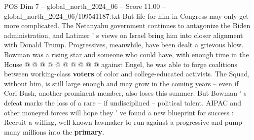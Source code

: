 \begin{textsample}{POS Dim 7 – global\_north\_2024\_06 – Score 11.00 – global\_north\_2024\_06/109541187.txt}
But life for him in Congress may only get more complicated.
The Netanyahu government continues to antagonize the Biden administration, and Latimer ' s views on Israel bring him into closer alignment with Donald Trump.
Progressives, meanwhile, have been dealt a grievous blow.
Bowman was a rising star and someone who could have, with enough time in the House @ @ @ @ @ @ @ @ @ @ against Engel, he was able to forge coalitions between working-class \textbf{voters} of color and college-educated activists.
The Squad, without him, is still large enough and may grow in the coming years -- even if Cori Bush, another prominent member, also loses this summer.
But Bowman ' s defeat marks the loss of a rare -- if undisciplined -- political talent.
AIPAC and other moneyed forces will hope they ' ve found a new blueprint for success : Recruit a willing, well-known lawmaker to run against a progressive and pump many millions into the \textbf{primary}.

\end{textsample}
